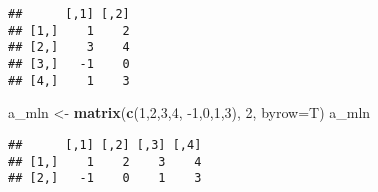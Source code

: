 \documentclass[]{article}
\newenvironment{Shaded}{\begin{snugshade}}{\end{snugshade}}
\newcommand{\DataTypeTok}[1]{\textcolor[rgb]{0.13,0.29,0.53}{#1}}
\newcommand{\DecValTok}[1]{\textcolor[rgb]{0.00,0.00,0.81}{#1}}
\newcommand{\KeywordTok}[1]{\textcolor[rgb]{0.13,0.29,0.53}{\textbf{#1}}}
\newcommand{\NormalTok}[1]{#1}
\newcommand{\StringTok}[1]{\textcolor[rgb]{0.31,0.60,0.02}{#1}}
\begin{document}
\begin{verbatim}
##      [,1] [,2]
## [1,]    1    2
## [2,]    3    4
## [3,]   -1    0
## [4,]    1    3
\end{verbatim}

\begin{Shaded}
\begin{Highlighting}[]
\NormalTok{a_mln <-}\StringTok{ }\KeywordTok{matrix}\NormalTok{(}\KeywordTok{c}\NormalTok{(}\DecValTok{1}\NormalTok{,}\DecValTok{2}\NormalTok{,}\DecValTok{3}\NormalTok{,}\DecValTok{4}\NormalTok{,}
              \DecValTok{-1}\NormalTok{,}\DecValTok{0}\NormalTok{,}\DecValTok{1}\NormalTok{,}\DecValTok{3}\NormalTok{), }\DecValTok{2}\NormalTok{, }\DataTypeTok{byrow=}\NormalTok{T)}
\NormalTok{a_mln}
\end{Highlighting}
\end{Shaded}

\begin{verbatim}
##      [,1] [,2] [,3] [,4]
## [1,]    1    2    3    4
## [2,]   -1    0    1    3
\end{verbatim}
\end{document}
